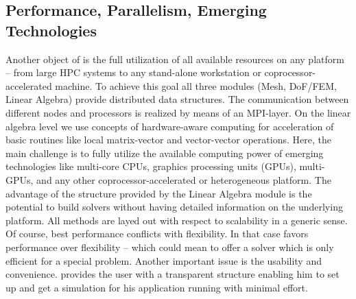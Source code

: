 \subsection{Performance, Parallelism, Emerging Technologies}
Another object of \hiflow{} is the full utilization of all available
resources on any platform -- from large HPC systems to any stand-alone
workstation or coprocessor-accelerated machine. To achieve this goal
all three modules (Mesh, DoF/FEM, Linear Algebra) provide distributed
data structures. The communication between different nodes and
processors is realized by means of an MPI-layer. On the linear algebra
level we use concepts of hardware-aware computing for acceleration of
basic routines like local matrix-vector and vector-vector
operations. Here, the main challenge is to fully utilize the available
computing power of emerging technologies like multi-core CPUs, 
graphics processing units (GPUs),
multi-GPUs, and any other coprocessor-accelerated or heterogeneous
platform. The advantage of the structure provided by the Linear
Algebra module is the potential to build solvers without having
detailed information on the underlying platform. All methods are layed
out with respect to scalability in a generic sense. Of course, best
performance conflicts with flexibility. In that case \hiflow{} favors
performance over flexibility -- which could mean to offer a solver
which is only efficient for a special problem. Another important issue
is the usability and convenience. \hiflow{} provides the user with a
transparent structure enabling him to set up and get a simulation for 
his application running with minimal effort.

